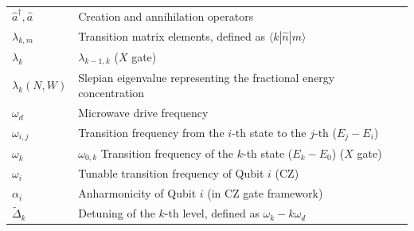 \begin{table}[htbp]
\begin{tabular}{l p{11cm}}
    $\hat{a}^\dagger, \hat{a}$ & Creation and annihilation operators                                               \\
    $\lambda_{k,m}$            & Transition matrix elements, defined as $\langle k|\hat{n}|m\rangle$               \\
    $\lambda_{k}$              & $\lambda_{k-1,k}$ ($X$ gate)                                                      \\
    $\lambda_k(N,W)$           & Slepian eigenvalue representing the fractional energy concentration               \\
    $\omega_d$                 & Microwave drive frequency                                                         \\
    $\omega_{i,j}$             & Transition frequency from the $i$-th state to the $j$-th ($E_j - E_i$)            \\
    $\omega_k$                 & $\omega_{0,k}$ Transition frequency of the $k$-th state ($E_k - E_0$)  ($X$ gate) \\
    $\omega_i$                 & Tunable transition frequency of Qubit $i$ (CZ)                                    \\
    $\alpha_i$                 & Anharmonicity of Qubit $i$ (in CZ gate framework)                                 \\
    $\tilde{\Delta}_k$         & Detuning of the $k$-th level, defined as $\omega_k - k\omega_d$                   \\

\end{tabular}
\end{table}
